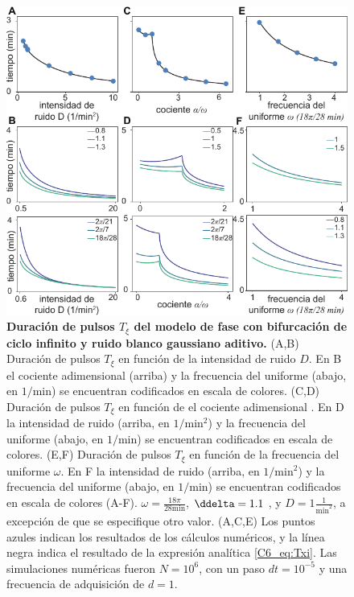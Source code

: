 {\begin{figure}
    \centering
    \includegraphics[width=1\columnwidth]{figures/chapter6/C6_duration.pdf} 
    \caption{\textbf{Duración de pulsos $T_\xi$ del modelo de fase con bifurcación de ciclo infinito y ruido blanco gaussiano aditivo.} (A,B) Duración de pulsos $T_\xi$ en función de la intensidad de ruido $D$. En B el cociente adimensional \ddelta (arriba) y la frecuencia del uniforme (abajo, en $1/\text{min}$) se encuentran codificados en escala de colores. (C,D) Duración de pulsos $T_\xi$ en función de el cociente adimensional \ddelta. En D la intensidad de ruido (arriba, en $1/\text{min}^2$) y la frecuencia del uniforme (abajo, en $1/\text{min}$) se encuentran codificados en escala de colores. (E,F) Duración de pulsos $T_\xi$ en función de la frecuencia del uniforme $\omega$. En F la intensidad de ruido (arriba, en $1/\text{min}^2$) y la frecuencia del uniforme (abajo, en $1/\text{min}$) se encuentran codificados en escala de colores (A-F). $\omega = \frac{18\pi}{28 \text{min}}$, $\ddelta = 1.1$ , y $D = 1 \frac{1}{\text{min}^2}$, a excepción de que se especifique otro valor. (A,C,E)  Los puntos azules indican los resultados de los cálculos numéricos, y la línea negra indica el resultado de la expresión analítica \ref{C6_eq:Txi}. Las simulaciones numéricas fueron $N=10^6$, con un paso $dt = 10^{-5}$ y una frecuencia de adquisición de $d=1$.}
    \label{C6_fig:duration}
\end{figure}


}

